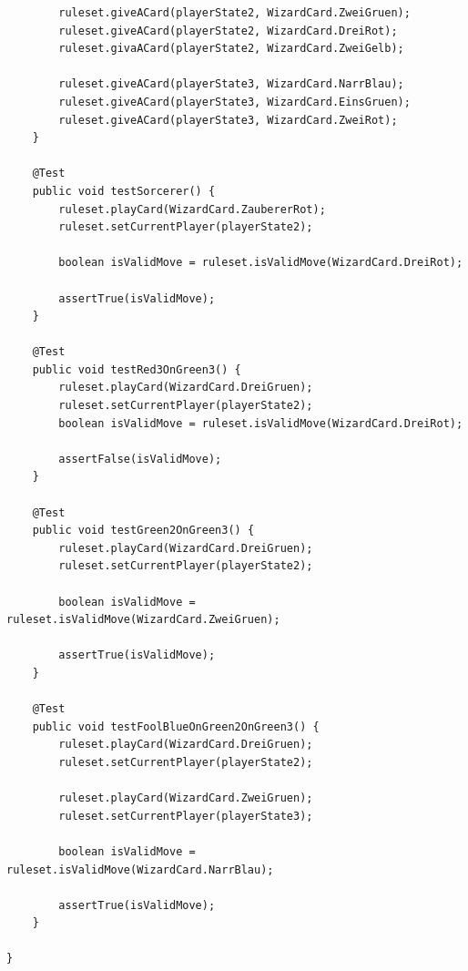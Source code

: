 \documentclass[twoside]{article}
\begin{document}
\begin{lstlisting}
		ruleset.giveACard(playerState2, WizardCard.ZweiGruen);
		ruleset.giveACard(playerState2, WizardCard.DreiRot);
		ruleset.givaACard(playerState2, WizardCard.ZweiGelb);
		
		ruleset.giveACard(playerState3, WizardCard.NarrBlau);
		ruleset.giveACard(playerState3, WizardCard.EinsGruen);
		ruleset.giveACard(playerState3, WizardCard.ZweiRot);
	}
	
	@Test
	public void testSorcerer() {
		ruleset.playCard(WizardCard.ZaubererRot);
		ruleset.setCurrentPlayer(playerState2);
		
		boolean isValidMove = ruleset.isValidMove(WizardCard.DreiRot);
		
		assertTrue(isValidMove);
	}
	
	@Test
	public void testRed3OnGreen3() {
		ruleset.playCard(WizardCard.DreiGruen);
		ruleset.setCurrentPlayer(playerState2);
		boolean isValidMove = ruleset.isValidMove(WizardCard.DreiRot);
		
		assertFalse(isValidMove);
	}
	
	@Test
	public void testGreen2OnGreen3() {
		ruleset.playCard(WizardCard.DreiGruen);
		ruleset.setCurrentPlayer(playerState2);
		
		boolean isValidMove = ruleset.isValidMove(WizardCard.ZweiGruen);
		
		assertTrue(isValidMove);
	}
	
	@Test
	public void testFoolBlueOnGreen2OnGreen3() {
		ruleset.playCard(WizardCard.DreiGruen);
		ruleset.setCurrentPlayer(playerState2);
		
		ruleset.playCard(WizardCard.ZweiGruen);
		ruleset.setCurrentPlayer(playerState3);
		
		boolean isValidMove = ruleset.isValidMove(WizardCard.NarrBlau);
		
		assertTrue(isValidMove);
	}

}
\end{lstlisting}
\end{document}
